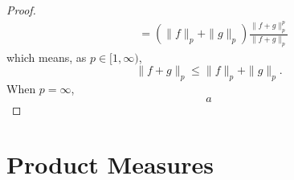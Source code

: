 \begin{proof}
\begin{equation*}
\begin{aligned}
			                & =\left(\|f\|_{p}+\|g\|_{p}\right) \frac{\|f+g\|_{p}^{p}}{\|f+g\|_{p}}
		\end{aligned}
	\end{equation*}
	which means, as $p\in[1,\infty)$,
	\begin{equation*}
		\|f+g\|_{p} \leq\|f\|_{p}+\|g\|_{p}.
	\end{equation*}
	When $p=\infty$,
	\begin{equation*}
		a
	\end{equation*}
\end{proof}

\begin{theorem}

\end{theorem}

\begin{theorem}

\end{theorem}

\begin{theorem}

\end{theorem}

\section{Product Measures}

\begin{theorem}

\end{theorem}
